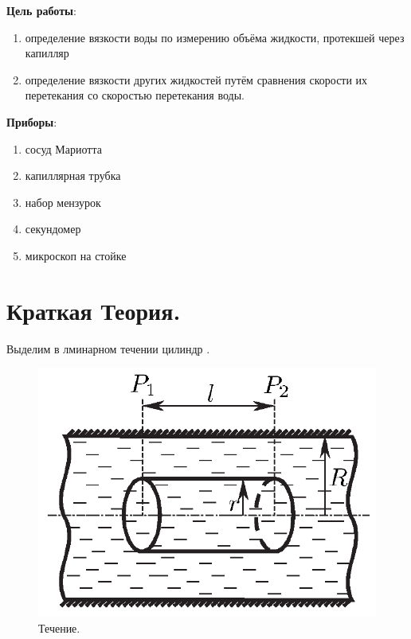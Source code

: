 \documentclass[a4paper,12pt]{article}
\numberwithin{equation}{section}
\begin{document}

\tableofcontents
\listoffigures
\listoftables

\newpage

\textbf{Цель работы}:
\begin{enumerate}
  \item определение вязкости воды по измерению объёма жидкости, протекшей через капилляр
  \item определение вязкости других жидкостей путём сравнения скорости их перетекания со скоростью перетекания воды.
\end{enumerate}

\textbf{Приборы}:
\begin{enumerate}
  \item сосуд Мариотта
  \item капиллярная трубка
  \item набор мензурок
  \item секундомер
  \item микроскоп на стойке
\end{enumerate}

\section{Краткая Теория.}

Выделим в лминарном течении цилиндр .

\begin{figure} [H]
  \center
  \includegraphics[scale=0.4]{data/pic1.png}
  \caption{Течение. \label{fig:flux}}
\end{figure}
\end{document}
